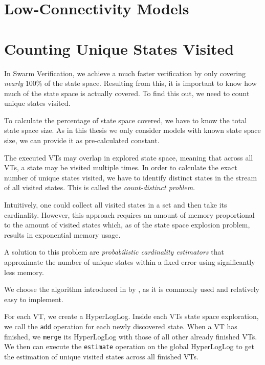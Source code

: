 \documentclass[
fancyheadings, %
%
%
]{stsreprt}
\newcommand{\citeinline}[1]{\citetitle{#1} by \citeauthor*{#1} \cite{#1}}
\begin{document}
\section{Low-Connectivity Models}



\section{Counting Unique States Visited}
\label{section:theory:counting-unique-states-visited}

In Swarm Verification, we achieve a much faster verification by only covering \emph{nearly} 100\% of the state space.
Resulting from this, it is important to know how much of the state space is actually covered.
To find this out, we need to count unique states visited.

To calculate the percentage of state space covered, we have to know the total state space size.
As in this thesis we only consider models with known state space size, we can provide it as pre-calculated constant.

The executed VTs may overlap in explored state space, meaning that across all VTs, a state may be visited multiple times.
In order to calculate the exact number of unique states visited, we have to identify distinct states in the stream of all visited states.
This is called the \emph{count-distinct problem}.

Intuitively, one could collect all visited states in a set and then take its cardinality.
However, this approach requires an amount of memory proportional to the amount of visited states which, as of the state space explosion problem, results in exponential memory usage.

A solution to this problem are \emph{probabilistic cardinality estimators} that approximate the number of unique states within a fixed error using significantly less memory.

We choose the algorithm introduced in \citeinline{Flajolet2007.HyperLogLog}, as it is commonly used and relatively easy to implement.

For each VT, we create a HyperLogLog.
Inside each VTs state space exploration, we call the \texttt{add} operation for each newly discovered state.
When a VT has finished, we \texttt{merge} its HyperLogLog with those of all other already finished VTs.
We then can execute the \texttt{estimate} operation on the global HyperLogLog to get the estimation of unique visited states across all finished VTs.
\end{document}
